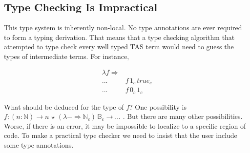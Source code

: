  

 
 
 
 
 
 
\subsection{Type Checking Is Impractical}
 
This type system is inherently non-local.
No type annotations are ever required to form a typing derivation.
That means that a type checking algorithm that attempted to type check every well typed \ac{TAS} term would need to guess the types of intermediate terms.
For instance,
 
\begin{align*}
\lambda f\Rightarrow & \,\\
... & f\,1_{c}\,true_{c}\\
... & f\,0_{c}\,1_{c}
\end{align*}

What should be deduced for the type of $f$? One possibility is $f:\left(n:\mathbb{N}\right)\rightarrow n\,\star\,\left(\lambda-\Rightarrow\mathbb{N}_{c}\right)\,\mathbb{B}_{c}\rightarrow...$ .
But there are many other possibilities.
Worse, if there is an error, it may be impossible to localize to a specific region of code.
To make a practical type checker we need to insist that the user include some type annotations.